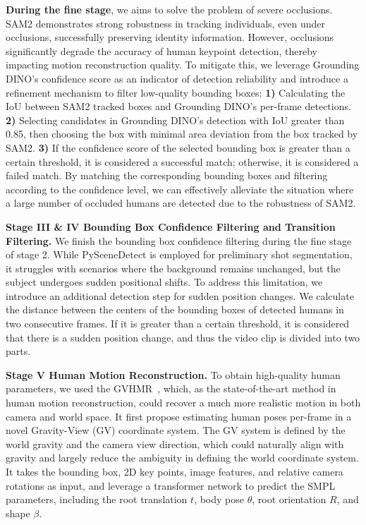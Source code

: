 \textbf{During the fine stage}, we aims to solve the problem of severe occlusions.
SAM2 demonstrates strong robustness in tracking individuals, even under occlusions, successfully preserving identity information. However, occlusions significantly degrade the accuracy of human keypoint detection, thereby impacting motion reconstruction quality. To mitigate this, we leverage Grounding DINO’s confidence score as an indicator of detection reliability and introduce a refinement mechanism to filter low-quality bounding boxes: 
\textbf{1)} Calculating the IoU between SAM2 tracked boxes and Grounding DINO’s per-frame detections. \textbf{2)} Selecting candidates in Grounding DINO's detection with IoU greater than 0.85, then choosing the box with minimal area deviation from the box tracked by SAM2. \textbf{3)} If the confidence score of the selected bounding box is greater than a certain threshold, it is considered a successful match; otherwise, it is considered a failed match. By matching the corresponding bounding boxes and filtering according to the confidence level, we can effectively alleviate the situation where a large number of occluded humans are detected due to the robustness of SAM2.

\textbf{Stage III \& IV Bounding Box Confidence Filtering and Transition Filtering.} We finish the bounding box confidence filtering during the fine stage of stage 2. 
While PySceneDetect is employed for preliminary shot segmentation, it struggles with scenarios where the background remains unchanged, but the subject undergoes sudden positional shifts. To address this limitation, we introduce an additional detection step for sudden position changes. We calculate the distance between the centers of the bounding boxes of detected humans in two consecutive frames. If it is greater than a certain threshold, it is considered that there is a sudden position change, and thus the video clip is divided into two parts. 

\textbf{Stage V Human Motion Reconstruction.} To obtain high-quality human parameters, we used the GVHMR~\cite{shen2024world}, which, as the state-of-the-art method in human motion reconstruction, could recover a much more realistic motion in both camera and world space. It first propose estimating human poses per-frame in a novel Gravity-View (GV) coordinate system. The GV system is defined by the world gravity and the camera view direction, which could naturally align with gravity and largely reduce the ambiguity in defining the world coordinate system. It takes the bounding box, 2D key points, image features, and relative camera rotations as input, and leverage a transformer network to predict the SMPL parameters, including the root translation $t$, body pose $\theta$, root orientation $R$, and shape $\beta$.


